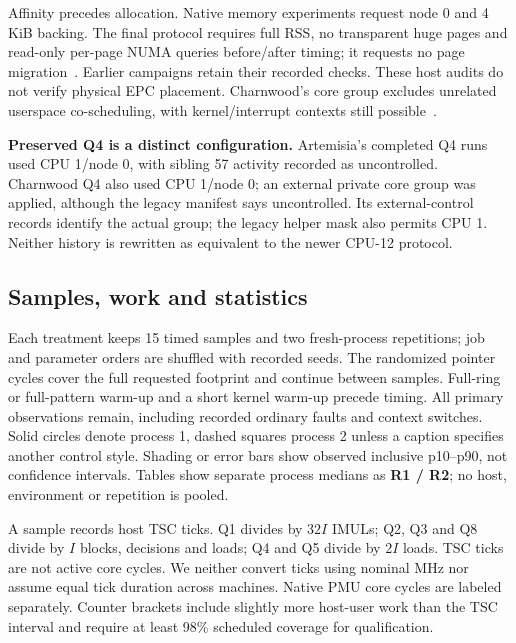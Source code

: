 \documentclass[11pt,letterpaper]{article}
\begin{document}
Affinity precedes allocation. Native memory experiments request node 0 and
4 KiB backing. The final protocol requires full RSS, no transparent huge pages
and read-only per-page NUMA queries before/after timing; it requests no page
migration~\cite{movepages}. Earlier campaigns retain their recorded checks.
These host audits do not verify physical EPC placement. Charnwood's core group
excludes unrelated userspace co-scheduling, with kernel/interrupt contexts
still possible~\cite{coresched}.

\textbf{Preserved Q4 is a distinct configuration.} Artemisia's completed Q4
runs used CPU 1/node 0, with sibling 57 activity recorded as uncontrolled.
Charnwood Q4 also used CPU 1/node 0; an external private core group was applied,
although the legacy manifest says uncontrolled. Its external-control records
identify the actual group; the legacy helper mask also permits CPU 1. Neither
history is rewritten as equivalent to the newer CPU-12 protocol.

\subsection{Samples, work and statistics}
Each treatment keeps 15 timed samples and two fresh-process repetitions; job
and parameter orders are shuffled with recorded seeds. The randomized pointer
cycles cover the full requested footprint and continue between samples.
Full-ring or full-pattern warm-up and a short kernel warm-up precede timing.
All primary observations remain, including recorded ordinary faults and
context switches. Solid circles denote process 1, dashed squares process 2
unless a caption specifies another control style. Shading or error bars show
observed inclusive p10--p90, not confidence intervals. Tables show separate
process medians as \textbf{R1 / R2}; no host, environment or repetition is pooled.

A sample records host TSC ticks. Q1 divides by $32I$ IMULs; Q2, Q3 and Q8 divide
by $I$ blocks, decisions and loads; Q4 and Q5 divide by $2I$ loads. TSC ticks
are not active core cycles. We neither convert ticks using nominal MHz nor
assume equal tick duration across machines. Native PMU core cycles are labeled
separately. Counter brackets include slightly more host-user work than the
TSC interval and require at least 98\% scheduled coverage for qualification.

\clearpage
\end{document}
